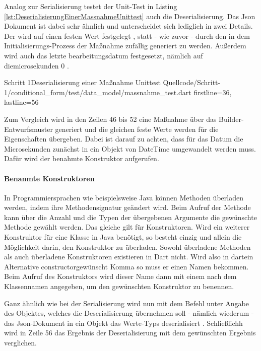 Analog zur Serialisierung testet der Unit-Test in Listing \ref{lst:DeserialisierungEinerMassnahmeUnittest} auch die Deserialisierung. Das Json Dokument ist dabei sehr ähnlich und unterscheidet sich lediglich in zwei Details. Der  wird auf einen festen Wert festgelegt , statt - wie zuvor - durch den in dem Initialisierungs-Prozess der Maßnahme zufällig generiert zu werden. Außerdem wird auch das letzte bearbeitungsdatum festgesetzt, nämlich auf diemicrosekunden 0 . 

\begin{alexlisting}{Schritt 1}{Deserialisierung einer Maßnahme Unittest}
  {Quellcode/Schritt-1/conditional_form/test/data_model/massnahme_test.dart}
  {firstline=36, lastline=56}
  \label{lst:DeserialisierungEinerMassnahmeUnittest}
\end{alexlisting}


Zum Vergleich wird in den Zeilen 46 bis 52 eine Maßnahme über das Builder-Entwurfsmuster generiert und die gleichen feste Werte werden für die Eigenschaften übergeben. Dabei ist darauf zu achten, dass für das Datum die Microsekunden zunächst in ein Objekt von DateTime umgewandelt werden muss. Dafür wird der benahmte Konstruktor   aufgerufen.

\paragraph{Benanmte Konstruktoren} In Programmiersprachen wie beispielsweise Java können Methoden überladen werden, indem ihre Methodensignatur geändert wird. Beim Aufruf der Methode kann über die Anzahl und die Typen der übergebenen Argumente die gewünschte Methode gewählt werden. Das gleiche gilt für Konstruktoren. Wird ein weiterer Konstruktor für eine Klasse in Java benötigt, so besteht einzig und allein die Möglichkeit darin, den Konstruktor zu überladen. Sowohl überladene Methoden als auch überladene Konstruktoren existieren in Dart nicht. Wird also in dartein Alternative constructorgewünscht Komma so muss er einen Namen bekommen. Beim Aufruf des Konstruktors wird dieser Name dann mit einem  nach dem Klassennamen angegeben, um den gewünschten Konstruktor zu benennen.


Ganz ähnlich wie bei der Serialisierung wird nun mit dem Befehl    unter Angabe des Objektes, welches die Deserialisierung übernehmen soll - nämlich wiederum  - das Json-Dokument in ein Objekt das Werte-Typs  deserialisiert . Schließlichh wird in Zeile 56 das Ergebnis der Deserialisierung mit dem gewünschten Ergebnis verglichen.

